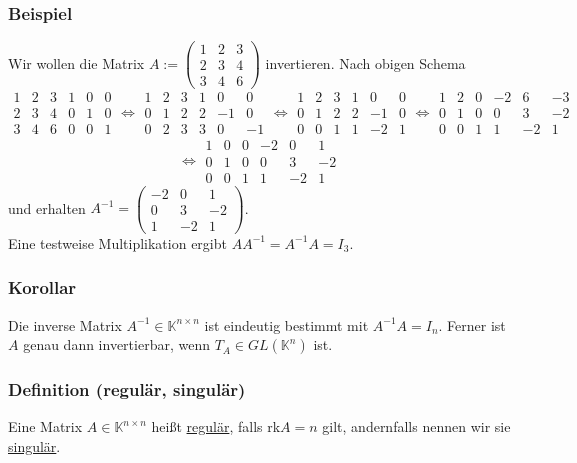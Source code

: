 \subsubsection{Beispiel}
Wir wollen die Matrix $A:=\begin{pmatrix}1&2&3\\2&3&4\\3&4&6\end{pmatrix}$ invertieren.  Nach obigen Schema
\[\begin{array}{ccc|ccc}1&2&3&1&0&0\\2&3&4&0&1&0\\3&4&6&0&0&1\end{array}\Leftrightarrow \begin{array}{ccc|ccc}1&2&3&1&0&0\\0&1&2&2&-1&0\\0&2&3&3&0&-1\end{array}\Leftrightarrow \begin{array}{ccc|ccc}1&2&3&1&0&0\\0&1&2&2&-1&0\\0&0&1&1&-2&1\end{array}\Leftrightarrow \begin{array}{ccc|ccc}1&2&0&-2&6&-3\\0&1&0&0&3&-2\\0&0&1&1&-2&1\end{array}\]
\[\Leftrightarrow \begin{array}{ccc|ccc}1&0&0&-2&0&1\\0&1&0&0&3&-2\\0&0&1&1&-2&1\end{array}\]
und erhalten $A^{-1}=\begin{pmatrix}-2&0&1\\0&3&-2\\1&-2&1\end{pmatrix}$.\\
Eine testweise Multiplikation ergibt $AA^{-1}=A^{-1}A=I_3$.
\subsubsection{Korollar}
\label{3.3.12}
Die inverse Matrix $A^{-1}\in\mathbb{K}^{n\times n}$ ist eindeutig bestimmt mit $A^{-1}A=I_n$.  Ferner ist $A$ genau dann invertierbar, wenn $T_A\in GL(\mathbb{K}^n)$ ist.
\subsubsection{Definition (regulär, singulär)}
\label{regulaer}
Eine Matrix $A\in\mathbb{K}^{n\times n}$ heißt \underline{regulär}, falls rk$A=n$ gilt, andernfalls nennen wir sie \underline{singulär}.
